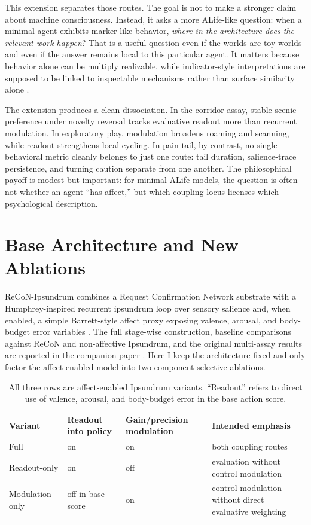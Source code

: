 \documentclass[letterpaper]{article}
\begin{document}
This extension separates those routes. The goal is not to make a stronger claim about machine consciousness. Instead, it asks a more ALife-like question: when a minimal agent exhibits marker-like behavior, \emph{where in the architecture does the relevant work happen}? That is a useful question even if the worlds are toy worlds and even if the answer remains local to this particular agent. It matters because behavior alone can be multiply realizable, while indicator-style interpretations are supposed to be linked to inspectable mechanisms rather than surface similarity alone \citep{ButlinEtAl2025Indicators}.

The extension produces a clean dissociation. In the corridor assay, stable scenic preference under novelty reversal tracks evaluative readout more than recurrent modulation. In exploratory play, modulation broadens roaming and scanning, while readout strengthens local cycling. In pain-tail, by contrast, no single behavioral metric cleanly belongs to just one route: tail duration, salience-trace persistence, and turning caution separate from one another. The philosophical payoff is modest but important: for minimal ALife models, the question is often not whether an agent ``has affect,'' but which coupling locus licenses which psychological description.

\section{Base Architecture and New Ablations}
ReCoN-Ipsundrum combines a Request Confirmation Network substrate \citep{BachHerger2015ReCoN} with a Humphrey-inspired recurrent ipsundrum loop over sensory salience and, when enabled, a simple Barrett-style affect proxy exposing valence, arousal, and body-budget error variables \citep{Humphrey2023Sentience,Barrett2017HowEmotions}. The full stage-wise construction, baseline comparisons against ReCoN and non-affective Ipsundrum, and the original multi-assay results are reported in the companion paper \citep{Sanyal2026ReCoNIpsundrum}. Here I keep the architecture fixed and only factor the affect-enabled model into two component-selective ablations.

\begin{table}[t]
\centering
\small
\begin{tabular}{@{}p{}p{}p{}p{}@{}}
\toprule
Variant & Readout into policy & Gain/precision modulation & Intended emphasis \\
\midrule
Full & on & on & both coupling routes \\
Readout-only & on & off & evaluation without control modulation \\
Modulation-only & off in base score & on & control modulation without direct evaluative weighting \\
\bottomrule
\end{tabular}
\caption{All three rows are affect-enabled Ipsundrum variants. ``Readout'' refers to direct use of valence, arousal, and body-budget error in the base action score.}
\label{tab:variants}
\end{table}
\end{document}
